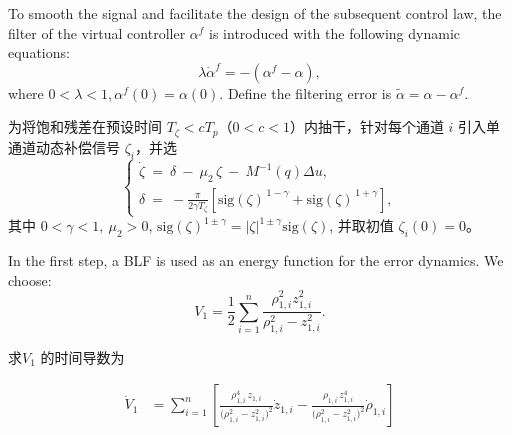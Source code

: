 \documentclass[pdflatex,sn-mathphys-num]{sn-jnl}%
\theoremstyle{thmstyleone}%
\theoremstyle{thmstyletwo}%
\theoremstyle{thmstylethree}%
\begin{document}




 To smooth the signal and facilitate the design of the subsequent control law, the filter of the virtual controller $\alpha^{f}$ is introduced with the following dynamic equations:
\begin{equation}\label{eq:22}
	\lambda \dot{\alpha}^{f}
	= -\left(\alpha^{f}-\alpha\right),	
\end{equation}
where $0<\lambda<1, \alpha^{f}(0)=\alpha(0)$. Define the filtering error is
$\tilde{\alpha}= \alpha-\alpha^{f}$.


为将饱和残差在预设时间 $T_\zeta<cT_p$（$0<c<1$）内抽干，针对每个通道 $i$ 引入单通道动态补偿信号 $\zeta_{i}$，并选
\begin{equation}\label{eq:zeta2-pts}
	\begin{cases}
\dot\zeta \ =\ \delta\ -\ \mu_2\,\zeta\ -\ M^{-1}(q)\Delta u,\\
\delta\ =\ -\frac{\pi}{2\gamma T_\zeta}\left[\mathrm{sig}(\zeta)^{\,1-\gamma}+\mathrm{sig}(\zeta)^{\,1+\gamma}\right],
	\end{cases}
\end{equation}
其中 $0<\gamma<1,\ \mu_2>0$, $\mathrm{sig}(\zeta)^{1\pm \gamma}=|\zeta|^{1\pm \gamma}\mathrm{sig}(\zeta)$, 并取初值 $\zeta_{i}(0)=0$。




In the first step, a BLF is used as an energy function for the error dynamics. We choose:
\begin{equation}\label{eq:25}
	V_1= \frac{1}{2}\sum_{i=1}^{n} \frac{\rho_{1,i}^2 z_{1,i}^2}{\rho_{1,i}^2-z_{1,i}^2}. 
\end{equation}

求$V_1$ 的时间导数为

\begin{equation}\label{eq:25}
	\begin{aligned}
\dot V_1
&=\sum_{i=1}^{n}\left[
\frac{\rho_{1,i}^4\,z_{1,i}}{\big(\rho_{1,i}^{2}-z_{1,i}^{2}\big)^{2}}\dot z_{1,i}
-
\frac{\rho_{1,i}\,z_{1,i}^{4}}{\big(\rho_{1,i}^{2}-z_{1,i}^{2}\big)^{2}}\dot \rho_{1,i}
\right]\\
\end{aligned}
\end{equation}
\end{document}

